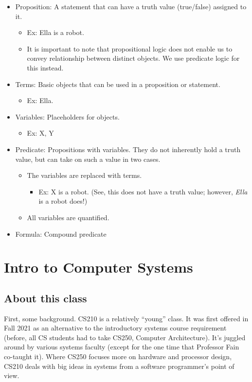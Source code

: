 \documentclass[fontsize=12pt,twoside=on,openright,parskip=half]{scrbook}
\begin{document}
\begin{itemize}
	\item Proposition:  A statement that can have a truth value (true/false)
		assigned to it.
		\begin{itemize}
			\item Ex: Ella is a robot.
			\item It is important to note that propositional logic does not
				enable us to convey relationship between distinct objects. We
				use predicate logic for this instead.
		\end{itemize}
	\item Terms:  Basic objects that can be used in a proposition or statement.
		\begin{itemize}
			\item Ex: Ella.
		\end{itemize}
	\item Variables: Placeholders for objects.
		\begin{itemize}
			\item Ex: X, Y
		\end{itemize}
	\item Predicate: Propositions with variables. They do not inherently hold a
		truth value, but can take on such a value in two cases. 
		\begin{itemize}
			\item The variables are replaced with terms.
				\begin{itemize}
					\item Ex: X is a robot. (See, this does not have a truth
						value; however, \emph{Ella} is a robot does!)
				\end{itemize}
			\item All variables are quantified.
		\end{itemize}
	\item Formula: Compound predicate
\end{itemize}

\chapter{Intro to Computer Systems}

\section*{About this class}

First, some background. CS210 is a relatively “young” class. It was first
offered in Fall 2021 as an alternative to the introductory systems course
requirement (before, all CS students had to take CS250, Computer Architecture).
It’s juggled around by various systems faculty (except for the one time that
Professor Fain co-taught it). Where CS250 focuses more on hardware and
processor design, CS210 deals with big ideas in systems from a software
programmer’s point of view. 
\end{document}
